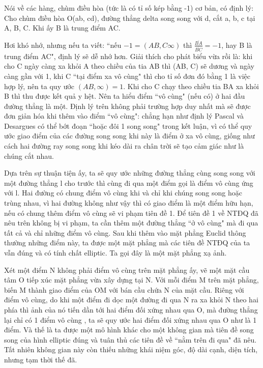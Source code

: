 \begin{multicols}{2}
	Nói về các hàng, chùm điều hòa (tức là có tỉ số kép bằng -1) cơ bản, có định lý:
	Cho chùm điều hòa O(ab, cd), đường thẳng delta song song với d, cắt a, b, c tại A, B, C. Khi ấy B là trung điểm AC. 
	
	Hơi khó nhớ, nhưng nếu ta viết: ``nếu $-1 = (AB, C \infty )$ thì $\frac{ \overline{BA}}{ \overline{BC}} = -1$, hay B là trung điểm AC", định lý sẽ dễ nhớ hơn.
	Giải thích cho phát biểu vừa rồi là: khi cho C ngày càng xa khỏi A theo chiều của tia AB thì (AB, C) sẽ dương và ngày càng gần với 1, khi C ``tại điểm xa vô cùng" thì cho tỉ số đơn đó bằng 1 là việc hợp lý, nên ta quy ước $(AB, \infty) = 1$. Khi cho C chạy theo chiều tia BA xa khỏi B thì thu được kết quả y hệt. Nên ta hiểu điểm ``vô cùng" (nếu có) ở hai đầu đường thẳng là một. Định lý trên không phải trường hợp duy nhất mà sẽ được đơn giản hóa khi thêm vào điểm ``vô cùng": chẳng hạn như định lý Pascal và Desargues có thể bớt đoạn ``hoặc đôi 1 song song" trong kết luận, vì có thể quy ước giao điểm của các đường song song khi này là điểm ở xa vô cùng, giống như cách hai đường ray song song khi kéo dài ra chân trời sẽ tạo cảm giác như là chúng cắt nhau.
	
	Dựa trên sự thuận tiện ấy, ta sẽ quy ước những đường thẳng cùng song song với một đường thẳng l cho trước thì cùng đi qua một điểm gọi là điểm vô cùng ứng với l. Hai đường có chung điểm vô cùng khi và chỉ khi chúng song song hoặc trùng nhau, vì hai đường không như vậy thì có giao điểm là một điểm hữu hạn, nếu có chung thêm điểm vô cùng sẽ vi phạm tiên đề 1. Để tiên đề 1 về NTĐQ đã nêu trên không bị vi phạm, ta cần thêm một đường thẳng ``ở vô cùng" mà đi qua tất cả và chỉ những điểm vô cùng. Sau khi thêm vào mặt phẳng Euclid thông thường những điểm này, ta được một mặt phẳng mà các tiên đề NTĐQ của ta vẫn đúng và có tính chất elliptic. Ta gọi đây là một mặt phẳng xạ ảnh.
	
	Xét một điểm N không phải điểm vô cùng trên mặt phẳng ấy, vẽ một mặt cầu tâm O tiếp xúc mặt phẳng vừa xây dựng tại N. Với mỗi điểm M trên mặt phẳng, biến M thành giao điểm của OM với bán cầu chứa N của mặt cầu. Riêng với điểm vô cùng, do khi một điểm đi dọc một đường đi qua N ra xa khỏi N theo hai phía thì ảnh của nó tiến dần tới hai điểm đối xứng nhau qua O, mà đường thẳng lại chỉ có 1 điểm vô cùng , ta sẽ quy ước hai điểm đối xứng nhau qua O như là 1 điểm. Và thế là ta được một mô hình khác cho một không gian mà tiên đề song song của hình elliptic đúng và tuân thủ các tiên đề về ``nằm trên đi qua" đã nêu. Tất nhiên không gian này còn thiếu những khái niệm góc, độ dài cạnh, diện tích, nhưng tạm thời thế đã.
	

\end{multicols}
